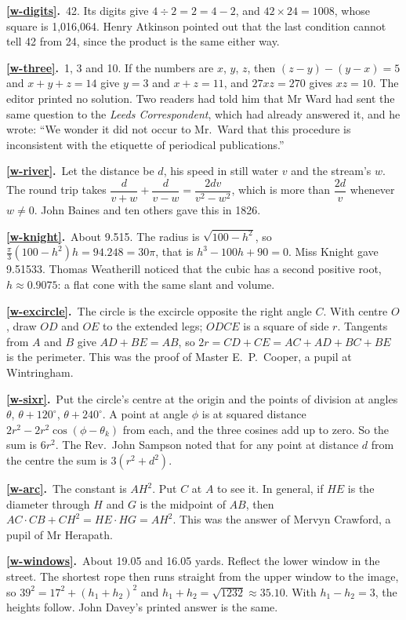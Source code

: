 \documentclass[11pt,a4paper]{article}
\newcommand{\ans}[2]{\par\smallskip\noindent\textbf{\ref{#1}.}\ #2}
\begin{document}
\ans{w-digits}{42. Its digits give $4\div2 = 2 = 4 - 2$, and $42\times24 = 1008$, whose
square is 1,016,064. Henry Atkinson pointed out that the last condition cannot tell 42
from 24, since the product is the same either way.}

\ans{w-three}{1, 3 and 10. If the numbers are $x$, $y$, $z$, then $(z-y)-(y-x) = 5$ and
$x+y+z = 14$ give $y = 3$ and $x + z = 11$, and $27xz = 270$ gives $xz = 10$. The editor
printed no solution. Two readers had told him that Mr Ward had sent the same question to
the \textit{Leeds Correspondent}, which had already answered it, and he wrote: ``We wonder
it did not occur to Mr.~Ward that this procedure is inconsistent with the etiquette of
periodical publications.''}

\ans{w-river}{Let the distance be $d$, his speed in still water $v$ and the stream's $w$.
The round trip takes $\dfrac d{v+w} + \dfrac d{v-w} = \dfrac{2dv}{v^2-w^2}$, which is
more than $\dfrac{2d}v$ whenever $w \ne 0$. John Baines and ten others gave this in
1826.}

\ans{w-knight}{About 9.515. The radius is $\sqrt{100 - h^2}$, so
$\tfrac\pi3(100 - h^2)h = 94.248 = 30\pi$, that is $h^3 - 100h + 90 = 0$. Miss Knight
gave 9.51533. Thomas Weatherill noticed that the cubic has a second positive root,
$h \approx 0.9075$: a flat cone with the same slant and volume.}

\ans{w-excircle}{The circle is the excircle opposite the right angle $C$. With centre $O$,
draw $OD$ and $OE$ to the extended legs; $ODCE$ is a square of side $r$. Tangents from $A$
and $B$ give $AD + BE = AB$, so $2r = CD + CE = AC + AD + BC + BE$ is the perimeter. This
was the proof of Master E.~P.~Cooper, a pupil at Wintringham.}

\ans{w-sixr}{Put the circle's centre at the origin and the points of division at angles
$\theta$, $\theta + 120^\circ$, $\theta + 240^\circ$. A point at angle $\phi$ is at squared
distance $2r^2 - 2r^2\cos(\phi - \theta_k)$ from each, and the three cosines add up to
zero. So the sum is $6r^2$. The Rev.~John Sampson noted that for any point at distance $d$
from the centre the sum is $3(r^2 + d^2)$.}

\ans{w-arc}{The constant is $AH^2$. Put $C$ at $A$ to see it. In general, if $HE$ is the
diameter through $H$ and $G$ is the midpoint of $AB$, then $AC\cdot CB + CH^2 = HE\cdot HG
= AH^2$. This was the answer of Mervyn Crawford, a pupil of Mr Herapath.}

\ans{w-windows}{About 19.05 and 16.05 yards. Reflect the lower window in the street. The
shortest rope then runs straight from the upper window to the image, so
$39^2 = 17^2 + (h_1 + h_2)^2$ and $h_1 + h_2 = \sqrt{1232} \approx 35.10$. With
$h_1 - h_2 = 3$, the heights follow. John Davey's printed answer is the same.}
\end{document}
